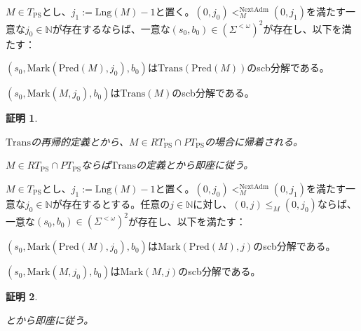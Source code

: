 \documentclass[dvipdfmx,uplatex]{jsarticle}
\theoremstyle{customnonumberbreakfortheorem}
\theoremstyle{customnonumberbreakforproof}
\newtheorem{hideableproof}{証明}
\begin{document}
\begin{proposition}\label{TransとNextAdmの関係}
	\(M \in T_{\textrm{PS}}\)とし、\(j_1 := \textrm{Lng}(M) - 1\)と置く。\((0,j_0) <_M^{\textrm{NextAdm}} (0,j_1)\)を満たす一意な\(j_0 \in \mathbb{N}\)が存在するならば、一意な\((s_0,b_0) \in (\Sigma^{< \omega})^2\)が存在し、以下を満たす：
	\begin{penumerate}
		\item \((s_0,\textrm{Mark}(\textrm{Pred}(M),j_0),b_0)\)は\(\textrm{Trans}(\textrm{Pred}(M))\)のscb分解である。
		\item \((s_0,\textrm{Mark}(M,j_0),b_0)\)は\(\textrm{Trans}(M)\)のscb分解である。
	\end{penumerate}
\end{proposition}

\begin{hideableproof}
	\begin{indented}
		\item \(\textrm{Trans}\)の再帰的定義とから、\(M \in RT_{\textrm{PS}} \cap PT_{\textrm{PS}}\)の場合に帰着される。
		\item \(M \in RT_{\textrm{PS}} \cap PT_{\textrm{PS}}\)ならば\(\textrm{Trans}\)の定義とから即座に従う。
	\end{indented}
\end{hideableproof}

\begin{corollary}\label{MarkとNextAdmの関係}
	\(M \in T_{\textrm{PS}}\)とし、\(j_1 := \textrm{Lng}(M) - 1\)と置く。\((0,j_0) <_M^{\textrm{NextAdm}} (0,j_1)\)を満たす一意な\(j_0 \in \mathbb{N}\)が存在するとする。任意の\(j \in \mathbb{N}\)に対し、\((0,j) \leq_M (0,j_0)\)ならば、一意な\((s_0,b_0) \in (\Sigma^{< \omega})^2\)が存在し、以下を満たす：
	\begin{penumerate}
		\item \((s_0,\textrm{Mark}(\textrm{Pred}(M),j_0),b_0)\)は\(\textrm{Mark}(\textrm{Pred}(M),j)\)のscb分解である。
		\item \((s_0,\textrm{Mark}(M,j_0),b_0)\)は\(\textrm{Mark}(M,j)\)のscb分解である。
	\end{penumerate}
\end{corollary}

\begin{hideableproof}
	\begin{indented}
		\item {}とから即座に従う。
	\end{indented}
\end{hideableproof}
\end{document}
